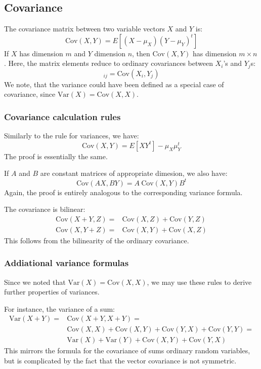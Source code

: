 \documentclass[12pt, a4paper]{article}
\numberwithin{equation}{section}
\begin{document}
\subsection{Covariance}
The covariance matrix between two variable vectors $X$ and $Y$ is:
\begin{equation}
\textrm{Cov}(X,Y)=E[(X-\mu_X)(Y-\mu_Y)^t]
\end{equation}
If $X$ has dimension $m$ and $Y$ dimension $n$, then $\textrm{Cov}(X,Y)$ has dimension $m\times n$. Here, the matrix elements reduce to ordinary covariances between $X_i$'s and $Y_j$s:
\begin{equation}
[\textrm{Cov}(X,Y)]_{ij}=\textrm{Cov}(X_i,Y_j)
\end{equation}
We note, that the variance could have been defined as a special case of covariance, since $\textrm{Var}(X)=\textrm{Cov}(X,X)$.

\subsubsection{Covariance calculation rules}
Similarly to the rule for variances, we have:
\begin{equation}
\textrm{Cov}(X,Y)=E[XY^t]-\mu_X\mu_Y^t
\end{equation}
The proof is essentially the same.

If $A$ and $B$ are constant matrices of appropriate dimesion, we also have:
\begin{equation}
\textrm{Cov}(AX,BY)=A\ \textrm{Cov}(X,Y)B^t
\end{equation}
Again, the proof is entirely analogous to the corresponding variance formula.

The covariance is bilinear:
\begin{align}
\textrm{Cov}(X+Y,Z)=&\textrm{Cov}(X,Z)+\textrm{Cov}(Y,Z)\\
\textrm{Cov}(X,Y+Z)=&\textrm{Cov}(X,Y)+\textrm{Cov}(X,Z)
\end{align}
This follows from the bilinearity of the ordinary covariance.

\subsubsection{Addiational variance formulas}
Since we noted that $\textrm{Var}(X)=\textrm{Cov}(X,X)$, we may use these rules to derive further properties of variances.

For instance, the variance of a sum:
\begin{align}
\textrm{Var}(X+Y)=&\textrm{Cov}(X+Y,X+Y)=\\
&\textrm{Cov}(X,X)+\textrm{Cov}(X,Y)+\textrm{Cov}(Y,X)+\textrm{Cov}(Y,Y)=\\
&\textrm{Var}(X)+\textrm{Var}(Y)+\textrm{Cov}(X,Y)+\textrm{Cov}(Y,X)
\end{align}
This mirrors the formula for the covariance of sums ordinary random variables, but is complicated by the fact that the vector covariance is not symmetric.
\end{document}

